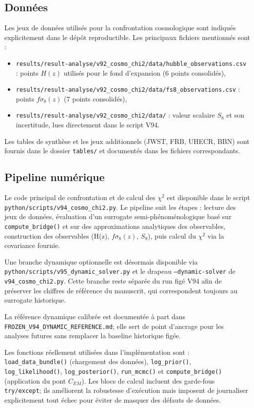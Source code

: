 \documentclass[11pt,a4paper]{article}
\begin{document}
\subsection{Données}
Les jeux de données utilisés pour la confrontation cosmologique sont indiqués explicitement dans le dépôt reproductible. Les principaux fichiers mentionnés sont :
\begin{itemize}
	\item \texttt{results/result-analyse/v92\_cosmo\_chi2/data/hubble\_observations.csv} : points $H(z)$ utilisés pour le fond d'expansion (6 points consolidés),
	\item \texttt{results/result-analyse/v92\_cosmo\_chi2/data/fs8\_observations.csv} : points $f\sigma_8(z)$ (7 points consolidés),
	\item \texttt{results/result-analyse/v92\_cosmo\_chi2/data/} : valeur scalaire $S_8$ et son incertitude, lues directement dans le script V94.
\end{itemize}
Les tables de synthèse et les jeux additionnels (JWST, FRB, UHECR, BBN) sont fournis dans le dossier \texttt{tables/} et documentés dans les fichiers correspondants.

\subsection{Pipeline numérique}
Le code principal de confrontation et de calcul des $\chi^2$ est disponible dans le script \texttt{python/scripts/v94\_cosmo\_chi2.py}. Le pipeline suit les étapes : lecture des jeux de données, évaluation d'un surrogate semi-phénoménologique basé sur \texttt{compute\_bridge()} et sur des approximations analytiques des observables, construction des observables (H(z), $f\sigma_8(z)$, $S_8$), puis calcul du $\chi^2$ via la covariance fournie.

Une branche dynamique optionnelle est désormais disponible via \texttt{python/scripts/v95\_dynamic\_solver.py} et le drapeau \texttt{--dynamic-solver} de \texttt{v94\_cosmo\_chi2.py}. Cette branche reste séparée du run figé V94 afin de préserver les chiffres de référence du manuscrit, qui correspondent toujours au surrogate historique.

La référence dynamique calibrée est documentée à part dans \texttt{FROZEN\_V94\_DYNAMIC\_REFERENCE.md}; elle sert de point d'ancrage pour les analyses futures sans remplacer la baseline historique figée.

Les fonctions réellement utilisées dans l'implémentation sont : \texttt{load\_data\_bundle()} (chargement des données), \texttt{log\_prior()}, \texttt{log\_likelihood()}, \texttt{log\_posterior()}, \texttt{run\_mcmc()} et \texttt{compute\_bridge()} (application du pont $C_{EM}$). Les blocs de calcul incluent des garde-fous \texttt{try/except}; ils améliorent la robustesse d'exécution mais imposent de journaliser explicitement tout échec pour éviter de masquer des défauts de données.
\end{document}
